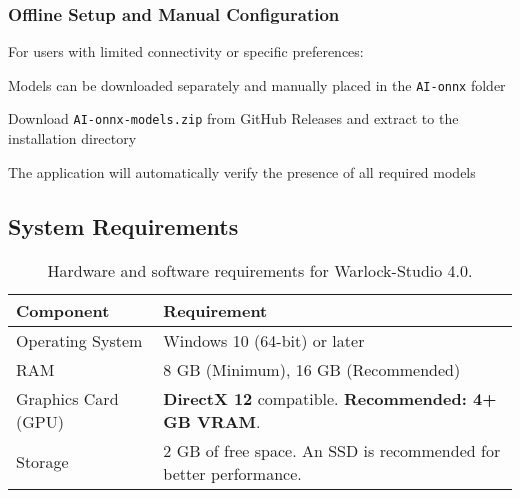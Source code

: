\documentclass[11pt, a4paper]{article}
\begin{document}
\subsubsection{Offline Setup and Manual Configuration}
For users with limited connectivity or specific preferences:
\begin{description}[leftmargin=*, style=nextline]
    \item[Offline Installation:] Models can be downloaded separately and manually placed in the \texttt{AI-onnx} folder
    \item[Manual Location:] Download \texttt{AI-onnx-models.zip} from GitHub Releases and extract to the installation directory
    \item[File Verification:] The application will automatically verify the presence of all required models
\end{description}

\subsection{System Requirements}
\begin{table}[H]
    \centering %
    \begin{tabular}{ll}
        \toprule %
        \textbf{Component} & \textbf{Requirement} \\
        \midrule %
        Operating System & Windows 10 (64-bit) or later \\
        RAM & 8 GB (Minimum), 16 GB (Recommended) \\
        Graphics Card (GPU) & \textbf{DirectX 12} compatible. \textbf{Recommended: 4+ GB VRAM}. \\
        Storage & 2 GB of free space. An SSD is recommended for better performance. \\
        \bottomrule %
    \end{tabular}
    \caption{Hardware and software requirements for Warlock-Studio 4.0.}
\end{table}
\end{document}
